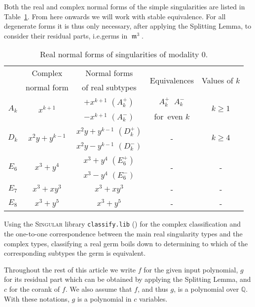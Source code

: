 \documentclass[noend]{amsproc}
\newcommand{\classify}{\texttt{classify.lib}}
\DeclareMathOperator{\requiv}{\overset{r}{\sim}}
\DeclareMathOperator{\m}{\mathfrak{m}}
\begin{document}
Both the real and complex normal forms of the simple singularities are listed
in Table~\ref{tab:normal_forms}. From here onwards we will work with stable
equivalence. For all degenerate forms it is thus only necessary, after
applying the Splitting Lemma, to consider their residual parts, i.e.\@ germs in $\m^3$.

\begin{table}[!htb]
\centering
\caption{Real normal forms of singularities of modality $0$.}
\label{tab:normal_forms}
\begin{tabular}{|c|c|c|c|c|}
\hline
& Complex & Normal forms & \multirow{2}{*}{Equivalences} &
\multirow{2}{*}{Values of $k$} \\
& normal form & of real subtypes & & \\
\hline
\multirow{2}{*}{$A_k$} & \multirow{2}{*}{$x^{k+1}$} & $+x^{k+1}$ $(A_k^+)$ &
$A_k^+ \requiv A_k^-$ & \multirow{2}{*}{$k \geq 1$} \\
& & $-x^{k+1}$ $(A_k^-)$ & for~even $k$ & \\
\hline
\multirow{2}{*}{$D_k$} & \multirow{2}{*}{$x^2y+y^{k-1}$} &
$x^2y+y^{k-1}$ $(D_k^+)$ & \multirow{2}{*}{-} &
\multirow{2}{*}{$k \geq 4$} \\
& & $x^2y-y^{k-1}$ $(D_k^-)$ & & \\
\hline
\multirow{2}{*}{$E_6$} & \multirow{2}{*}{$x^3+y^4$} & $x^3+y^4$ $(E_6^+)$ &
\multirow{2}{*}{-} & \multirow{2}{*}{-} \\
& & $x^3-y^4$ $(E_6^-)$ & & \\
\hline
$E_7$ & $x^3+xy^3$ & $x^3+xy^3$ & - & - \\
\hline
$E_8$ & $x^3+y^5$ & $x^3+y^5$ & - & - \\
\hline
\end{tabular}
\end{table}

Using the \textsc{Singular} library \classify{} (\cite{classify}) for the
complex classification and the one-to-one correspondence between the main real
singularity types and the complex types, classifying a real germ boils down to
determining to which of the corresponding subtypes the germ is equivalent.

Throughout the rest of this article we write $f$ for the given input
polynomial, $g$ for its residual part which can be obtained by applying the
Splitting Lemma, and $c$ for the corank of $f$.  We also assume that $f$, and
thus $g$, is a polynomial over $\mathbb Q$.  With these notations, $g$ is a
polynomial in $c$ variables.
\end{document}
